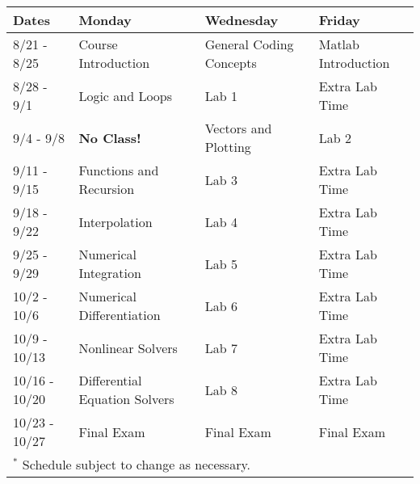 \documentclass[11pt]{article}
\begin{document}
\small

\begin{center}
	\begin{tabular}{l || l | l | l }
		\toprule
		\textbf{Dates} & \textbf{Monday} & \textbf{Wednesday} & \textbf{Friday}\\
		\midrule
		8/21  - 8/25  & Course Introduction           & General Coding Concepts & Matlab Introduction  \\
		8/28  - 9/1   & Logic and Loops               & Lab 1                   & Extra Lab Time       \\
		9/4   - 9/8   & \textbf{No Class!}            & Vectors and Plotting    & Lab 2                \\
		9/11  - 9/15  & Functions and Recursion       & Lab 3                   & Extra Lab Time       \\
		9/18  - 9/22  & Interpolation                 & Lab 4                   & Extra Lab Time       \\
		9/25  - 9/29  & Numerical Integration         & Lab 5                   & Extra Lab Time       \\
		10/2  - 10/6  & Numerical Differentiation     & Lab 6                   & Extra Lab Time       \\
		10/9  - 10/13 & Nonlinear Solvers             & Lab 7                   & Extra Lab Time       \\
		10/16 - 10/20 & Differential Equation Solvers & Lab 8                   & Extra Lab Time       \\
		10/23 - 10/27 & Final Exam                    & Final Exam              & Final Exam           \\
		\bottomrule
		\multicolumn{4}{l}{$^{*}$ Schedule subject to change as necessary.}\\
	\end{tabular}
\end{center}
\end{document}
